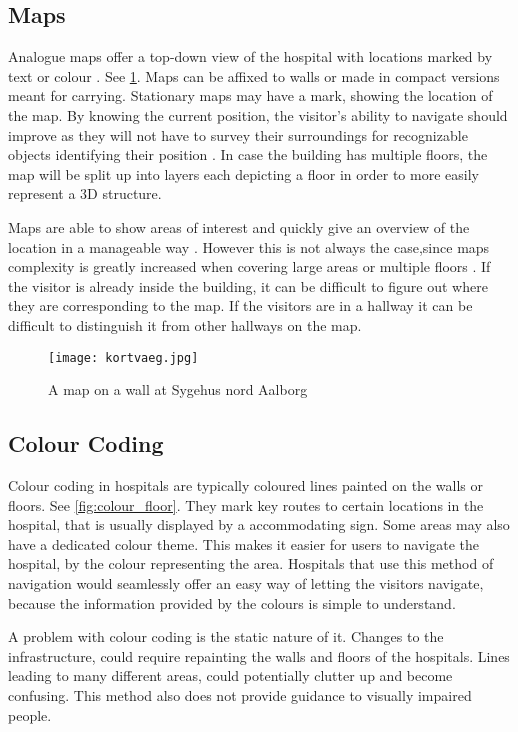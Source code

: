 \subsection{Maps} \label{sub:map}
Analogue maps \cite{map} offer a top-down view of the hospital with locations marked by text or colour \cite{art_Osborne}. See \cref{fig:map}. Maps can be affixed to walls or made in compact versions meant for carrying. Stationary maps may have a mark, showing the location of the map. By knowing the current position, the visitor's ability to navigate should improve as they will not have to survey their surroundings for recognizable objects identifying their position \cite{map_survey}. In case the building has multiple floors, the map will be split up into layers each depicting a floor in order to more easily represent a 3D structure.

Maps are able to show areas of interest and quickly give an overview of the location in a manageable way \cite{pros_analog_map}. However this is not always the case,since maps complexity is greatly increased when covering large areas or multiple floors \cite{map_confusing}. If the visitor is already inside the building, it can be difficult to figure out where they are corresponding to the map. If the visitors are in a hallway it can be difficult to distinguish it from other hallways on the map.

  \begin{figure}[ht!]
  \centering
  \texttt{[image: kortvaeg.jpg]}
  \caption{A map on a wall at Sygehus nord Aalborg}
  \label{fig:map}
  \end{figure}

\subsection{Colour Coding}\label{sub:col}
Colour coding in hospitals are typically coloured lines painted on the walls or floors. See \cref{fig:colour_floor}. They mark key routes to certain locations in the hospital, that is usually displayed by a accommodating sign. Some areas may also have a dedicated colour theme. This makes it easier for users to navigate the hospital, by the colour representing the area.
Hospitals that use this method of navigation would seamlessly offer an easy way of letting the visitors navigate, because the information provided by the colours is simple to understand.

A problem with colour coding is the static nature of it. Changes to the infrastructure, could require repainting the walls and floors of the hospitals. Lines leading to many different areas, could potentially clutter up and become confusing. This method also does not provide guidance to visually impaired people.

